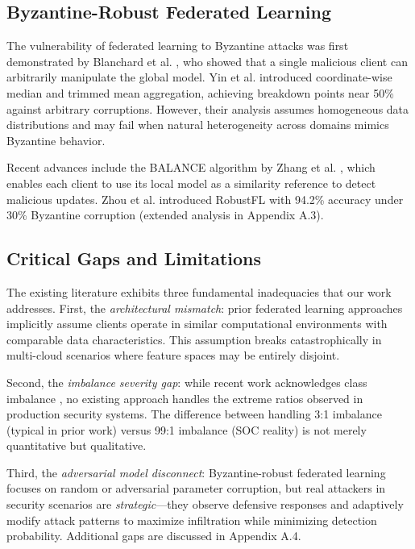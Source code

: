 \documentclass[12pt,a4paper]{article}
\theoremstyle{definition}
\begin{document}
\subsection{Byzantine-Robust Federated Learning}

The vulnerability of federated learning to Byzantine attacks was first demonstrated by Blanchard et al. \cite{blanchard2017machine}, who showed that a single malicious client can arbitrarily manipulate the global model. Yin et al. \cite{yin2018byzantine} introduced coordinate-wise median and trimmed mean aggregation, achieving breakdown points near 50\% against arbitrary corruptions. However, their analysis assumes homogeneous data distributions and may fail when natural heterogeneity across domains mimics Byzantine behavior.

Recent advances include the BALANCE algorithm by Zhang et al. \cite{zhang2024balance}, which enables each client to use its local model as a similarity reference to detect malicious updates. Zhou et al. \cite{zhou2024robust} introduced RobustFL with 94.2\% accuracy under 30\% Byzantine corruption (extended analysis in Appendix A.3).

\subsection{Critical Gaps and Limitations}

The existing literature exhibits three fundamental inadequacies that our work addresses. First, the \textit{architectural mismatch}: prior federated learning approaches \cite{mcmahan2017communication,li2020federated} implicitly assume clients operate in similar computational environments with comparable data characteristics. This assumption breaks catastrophically in multi-cloud scenarios where feature spaces may be entirely disjoint.

Second, the \textit{imbalance severity gap}: while recent work acknowledges class imbalance \cite{zhou2024robust,zhang2024privacy}, no existing approach handles the extreme ratios observed in production security systems. The difference between handling 3:1 imbalance (typical in prior work) versus 99:1 imbalance (SOC reality) is not merely quantitative but qualitative.

Third, the \textit{adversarial model disconnect}: Byzantine-robust federated learning \cite{blanchard2017machine,yin2018byzantine} focuses on random or adversarial parameter corruption, but real attackers in security scenarios are \textit{strategic}—they observe defensive responses and adaptively modify attack patterns to maximize infiltration while minimizing detection probability. Additional gaps are discussed in Appendix A.4.
\end{document}
